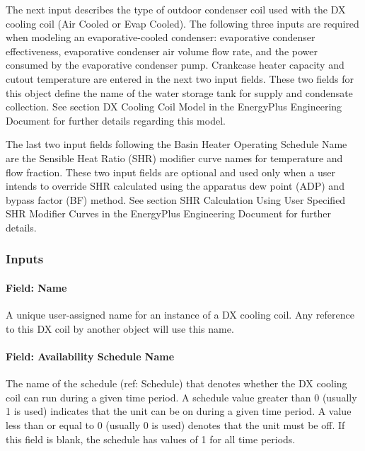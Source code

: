 The next input describes the type of outdoor condenser coil used with the DX cooling coil (Air Cooled or Evap Cooled). The following three inputs are required when modeling an evaporative-cooled condenser: evaporative condenser effectiveness, evaporative condenser air volume flow rate, and the power consumed by the evaporative condenser pump. Crankcase heater capacity and cutout temperature are entered in the next two input fields. These two fields for this object define the name of the water storage tank for supply and condensate collection. See section DX Cooling Coil Model in the EnergyPlus Engineering Document for further details regarding this model.

The last two input fields following the Basin Heater Operating Schedule Name are the Sensible Heat Ratio (SHR) modifier curve names for temperature and flow fraction. These two input fields are optional and used only when a user intends to override SHR calculated using the apparatus dew point (ADP) and bypass factor (BF) method. See section SHR Calculation Using User Specified SHR Modifier Curves in the EnergyPlus Engineering Document for further details.

\subsubsection{Inputs}\label{inputs-13-004}

\paragraph{Field: Name}\label{field-name-12-003}

A unique user-assigned name for an instance of a DX cooling coil. Any reference to this DX coil by another object will use this name.

\paragraph{Field: Availability Schedule Name}\label{field-availability-schedule-name-6-001}

The name of the schedule (ref: Schedule) that denotes whether the DX cooling coil can run during a given time period. A schedule value greater than 0 (usually 1 is used) indicates that the unit can be on during a given time period. A value less than or equal to 0 (usually 0 is used) denotes that the unit must be off. If this field is blank, the schedule has values of 1 for all time periods.

